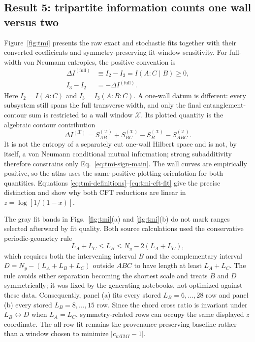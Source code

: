\documentclass[aps,prb,twocolumn,floatfix,nofootinbib,superscriptaddress]{revtex4-2}
\begin{document}
\subsection{Result 5: tripartite information counts one wall versus two}

Figure~\ref{fig:tmi} presents the raw exact and stochastic fits together with their
converted coefficients and symmetry-preserving fit-window sensitivity.
For full-width von Neumann entropies, the positive convention is
\begin{equation}
 \begin{aligned}
 \Delta I^{(\mathrm{full})}&\equiv I_2-I_3
 =I(A:C\mid B)\geq0,\\
 I_3-I_2&=-\Delta I^{(\mathrm{full})}.
 \end{aligned}
 \label{eq:tmi-sign-main}
\end{equation}
Here $I_2=I(A:C)$ and $I_3=I_3(A:B:C)$.  A one-wall datum is different: every subsystem
still spans the full transverse width, and only the final entanglement-contour sum is
restricted to a wall window $\mathcal X$.  Its plotted quantity is the algebraic contour
contribution
\begin{equation}
 \Delta I^{(\mathcal X)}=
 S_{AB}^{(\mathcal X)}+S_{BC}^{(\mathcal X)}
 -S_B^{(\mathcal X)}-S_{ABC}^{(\mathcal X)}.
 \label{eq:tmi-contour-main}
\end{equation}
It is not the entropy of a separately cut one-wall Hilbert space and is not, by itself, a
von Neumann conditional mutual information; strong subadditivity therefore constrains
only Eq.~\eqref{eq:tmi-sign-main}.  The wall curves are empirically positive, so the atlas
uses the same positive plotting orientation for both quantities.  Equations
\eqref{eq:tmi-definitions}--\eqref{eq:tmi-cft-fit} give the precise distinction and show
why both CFT reductions are linear in $z=\log[1/(1-x)]$.

The gray fit bands in Figs.~\ref{fig:tmi}(a) and \ref{fig:tmi}(b) do not mark ranges
selected afterward by fit quality.  Both source calculations used the conservative
periodic-geometry rule
\begin{equation}
 L_A+L_C\leq L_B\leq N_y-2(L_A+L_C),
 \label{eq:tmi-source-window}
\end{equation}
which requires both the intervening interval $B$ and the complementary interval
$D=N_y-(L_A+L_B+L_C)$ outside $ABC$ to have length at least $L_A+L_C$.  The rule avoids
either separation becoming the shortest scale and treats $B$ and $D$ symmetrically; it
was fixed by the generating notebooks, not optimized against these data.  Consequently,
panel (a) fits every stored $L_B=6,\ldots,28$ row and panel (b) every stored
$L_B=8,\ldots,15$ row.  Since the chord cross ratio is invariant under
$L_B\leftrightarrow D$ when $L_A=L_C$, symmetry-related rows can occupy the same displayed
$z$ coordinate.  The all-row fit remains the provenance-preserving baseline rather than a
window chosen to minimize $|c_{
m TMI}-1|$.
\end{document}
